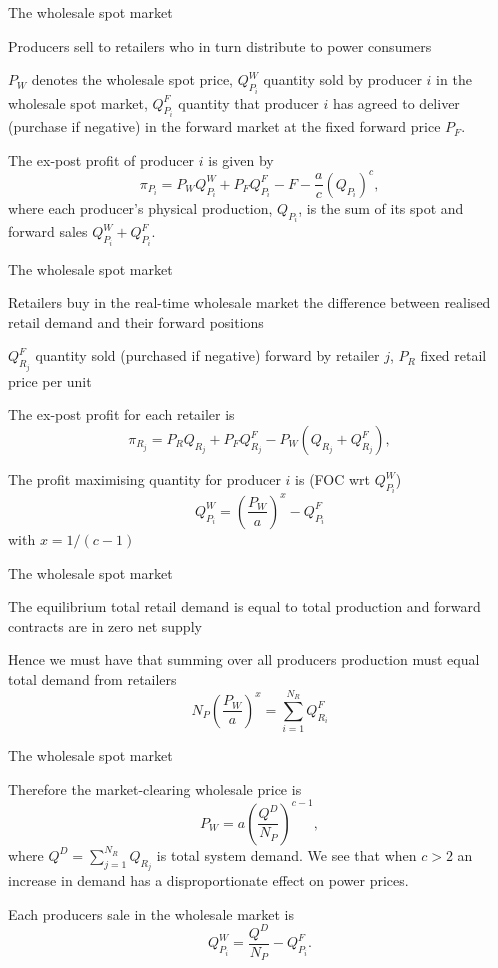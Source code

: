 {The wholesale spot market}
\item<1-> Producers sell to retailers who in turn distribute to power consumers
\item<2-> $P_W$ denotes the wholesale spot price, $Q_{P_i}^W$ quantity sold by producer $i$ in the wholesale spot market, $Q_{P_i}^F$ quantity
that producer $i$ has agreed to deliver (purchase if negative) in the forward market at the fixed forward price $P_F$.
\item<3-> The ex-post profit of producer $i$ is given by
$$
\pi_{P_i}=P_W Q_{P_i}^W + P_FQ_{P_i}^F
-F-\frac{a}{c}(Q_{P_i})^c,$$
where each producer's physical production, $Q_{P_i}$, is the sum of its spot and forward sales $Q_{P_i}^W+Q_{P_i}^F$.

{The wholesale spot market}
\item<1-> Retailers buy in the real-time wholesale market the difference between realised retail demand and their forward positions
\item<2-> $Q_{R_j}^F$ quantity sold (purchased if negative) forward by retailer $j$, $P_R$ fixed retail price per unit
\item<3-> The ex-post profit for each retailer is
$$
\pi_{R_j}=P_R Q_{R_j} + P_FQ_{R_j}^F - P_W (Q_{R_j}+Q_{R_j}^F),$$
\item<4-> The profit maximising quantity for producer $i$ is (FOC wrt $Q_{P_i}^W$)
$$Q_{P_i}^W=\left(\frac{P_W}{a}\right)^{x}-Q_{P_i}^F$$
with $x=1/(c-1)$

{The wholesale spot market}
\item<1-> The equilibrium total retail demand is equal to total production and forward contracts are in zero net supply
\item<2-> Hence we must have that summing over all producers production must equal total demand from retailers
$$
N_P\left(\frac{P_W}{a}\right)^{x}=\sum_{i=1}^{N_R}Q_{R_i}^F
$$

{The wholesale spot market}
\item<1-> Therefore the market-clearing wholesale price is
$$
P_W=a \left(\frac{Q^D}{N_P}\right)^{c-1},$$
where $Q^D=\sum_{j=1}^{N_R}Q_{R_j}$ is total system demand. We see that when $c>2$ an increase in demand has a disproportionate effect on power prices.
\item<2-> Each producers sale in the wholesale market is
$$
Q_{P_i}^W= \frac{Q^D}{N_P}-Q_{P_i}^F.
$$

